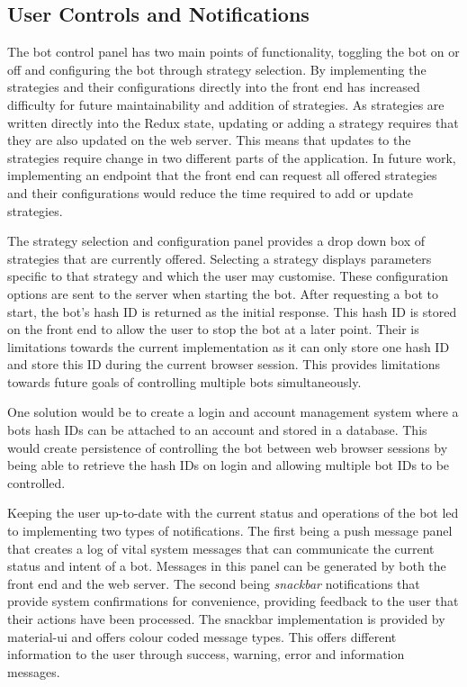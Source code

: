 \subsection{User Controls and Notifications}
\label{sec:implementation:frontend:controls_notifications}
\noindent The bot control panel has two main points of functionality, toggling the bot on or off and configuring the bot through strategy selection. By implementing the strategies and their configurations directly into the front end has increased difficulty for future maintainability and addition of strategies. As strategies are written directly into the Redux state, updating or adding a strategy requires that they are also updated on the web server. This means that updates to the strategies require change in two different parts of the application. In future work, implementing an endpoint that the front end can request all offered strategies and their configurations would reduce the time required to add or update strategies.

The strategy selection and configuration panel provides a drop down box of strategies that are currently offered. Selecting a strategy displays parameters specific to that strategy and which the user may customise. These configuration options are sent to the server when starting the bot. After requesting a bot to start, the bot's hash ID is returned as the initial response. This hash ID is stored on the front end to allow the user to stop the bot at a later point. Their is limitations towards the current implementation as it can only store one hash ID and store this ID during the current browser session. This provides limitations towards future goals of controlling multiple bots simultaneously.

One solution would be to create a login and account management system where a bots hash IDs can be attached to an account and stored in a database. This would create persistence of controlling the bot between web browser sessions by being able to retrieve the hash IDs on login and allowing multiple bot IDs to be controlled. 

Keeping the user up-to-date with the current status and operations of the bot led to implementing two types of notifications. The first being a push message panel that creates a log of vital system messages that can communicate the current status and intent of a bot. Messages in this panel can be generated by both the front end and the web server. The second being \textit{snackbar} notifications that provide system confirmations for convenience, providing feedback to the user that their actions have been processed. The snackbar implementation is provided by material-ui and offers colour coded message types. This offers different information to the user through success, warning, error and information messages.











